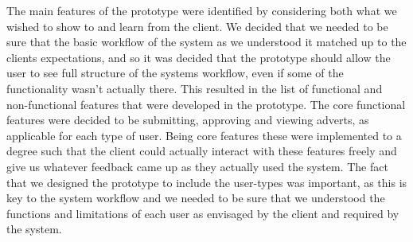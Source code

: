 The main features of the prototype were identified by considering both what we wished to show to
and learn from the client. We decided that we needed to be sure that the basic workflow of the system 
as we understood it matched up to the clients expectations, and so it was decided that the prototype should
allow the user to see full structure of the systems workflow, even if some of the functionality wasn't actually 
there. This resulted in the list of functional and non-functional features that were developed in the prototype.
The core functional features were decided to be submitting, approving and viewing adverts, as applicable for 
each type of user. Being core features these were implemented to a degree such that the client could actually
interact with these features freely and give us whatever feedback came up as they actually used the system. 
The fact that we designed the prototype to include the user-types was important, as this is key to the system 
workflow and we needed to be sure that we understood the functions and limitations of each user as envisaged
by the client and required by the system.